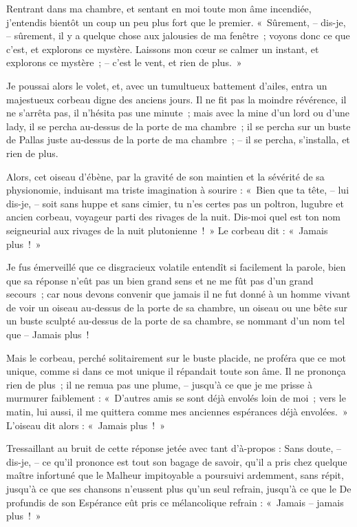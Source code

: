 \documentclass[openany]{book} %
\begin{document}
\bigskip
Rentrant dans ma chambre, et sentant en moi toute mon âme incendiée, j’entendis bientôt un coup un peu plus fort que le premier. «~Sûrement, – dis-je, – sûrement, il y a quelque chose aux jalousies de ma fenêtre~; voyons donc ce que c’est, et explorons ce mystère. Laissons mon cœur se calmer un instant, et explorons ce mystère~; – c’est le vent, et rien de plus.~»

\bigskip
Je poussai alors le volet, et, avec un tumultueux battement d’ailes, entra un majestueux corbeau digne des anciens jours. Il ne fit pas la moindre révérence, il ne s’arrêta pas, il n’hésita pas une minute~; mais avec la mine d’un lord ou d’une lady, il se percha au-dessus de la porte de ma chambre~; il se percha sur un buste de Pallas juste au-dessus de la porte de ma chambre~; – il se percha, s’installa, et rien de plus.

\bigskip
Alors, cet oiseau d’ébène, par la gravité de son maintien et la sévérité de sa physionomie, induisant ma triste imagination à sourire : «~Bien que ta tête, – lui dis-je, – soit sans huppe et sans cimier, tu n’es certes pas un poltron, lugubre et ancien corbeau, voyageur parti des rivages de la nuit. Dis-moi quel est ton nom seigneurial aux rivages de la nuit plutonienne~!~» Le corbeau dit : «~Jamais plus~!~»

\bigskip
Je fus émerveillé que ce disgracieux volatile entendît si facilement la parole, bien que sa réponse n’eût pas un bien grand sens et ne me fût pas d’un grand secours~; car nous devons convenir que jamais il ne fut donné à un homme vivant de voir un oiseau au-dessus de la porte de sa chambre, un oiseau ou une bête sur un buste sculpté au-dessus de la porte de sa chambre, se nommant d’un nom tel que – Jamais plus~!

Mais le corbeau, perché solitairement sur le buste placide, ne proféra que ce mot unique, comme si dans ce mot unique il répandait toute son âme. Il ne prononça rien de plus~; il ne remua pas une plume, – jusqu’à ce que je me prisse à murmurer faiblement : «~D’autres amis se sont déjà envolés loin de moi~; vers le matin, lui aussi, il me quittera comme mes anciennes espérances déjà envolées.~» L’oiseau dit alors : «~Jamais plus~!~»

\bigskip
Tressaillant au bruit de cette réponse jetée avec tant d’à-propos : Sans doute, – dis-je, – ce qu’il prononce est tout son bagage de savoir, qu’il a pris chez quelque maître infortuné que le Malheur impitoyable a poursuivi ardemment, sans répit, jusqu’à ce que ses chansons n’eussent plus qu’un seul refrain, jusqu’à ce que le De profundis de son Espérance eût pris ce mélancolique refrain : «~Jamais – jamais plus~!~»
\end{document}
